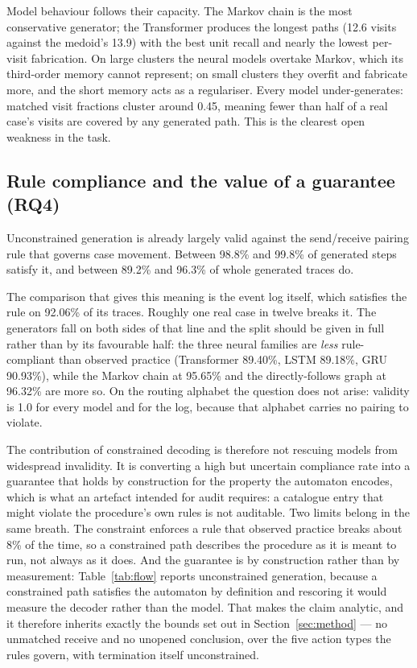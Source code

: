Model behaviour follows their capacity. The Markov chain is the most conservative generator; the
Transformer produces the longest paths (12.6 visits against the medoid's 13.9) with the best
unit recall and nearly the lowest per-visit fabrication. On large clusters the neural models
overtake Markov, which its third-order memory cannot represent; on small clusters they overfit
and fabricate more, and the short memory acts as a regulariser. Every model under-generates:
matched visit fractions cluster around 0.45, meaning fewer than half of a real case's visits are
covered by any generated path. This is the clearest open weakness in the task.



\subsection{Rule compliance and the value of a guarantee (RQ4)}\label{sec:res-rq4}

Unconstrained generation is already largely valid against the send/receive pairing rule that
governs case movement. Between 98.8\% and 99.8\% of generated steps satisfy it, and between
89.2\% and 96.3\% of whole generated traces do.

The comparison that gives this meaning is the event log itself, which satisfies the rule on
92.06\% of its traces. Roughly one real case in twelve breaks it. The generators fall on both
sides of that line and the split should be given in full rather than by its favourable half:
the three neural families are \emph{less} rule-compliant than observed practice (Transformer
89.40\%, LSTM 89.18\%, GRU 90.93\%), while the Markov chain at 95.65\% and the directly-follows
graph at 96.32\% are more so. On the routing alphabet the question does not arise: validity is
1.0 for every model and for the log, because that alphabet carries no pairing to violate.

The contribution of constrained decoding is therefore not rescuing models from widespread
invalidity. It is converting a high but uncertain compliance rate into a guarantee that holds by
construction for the property the automaton encodes, which is what an artefact intended for
audit requires: a catalogue entry that might violate the procedure's own rules is not auditable.
Two limits belong in the same breath. The constraint enforces a rule that observed practice
breaks about 8\% of the time, so a constrained path describes the procedure as it is meant to
run, not always as it does. And the guarantee is by construction rather than by measurement:
Table~\ref{tab:flow} reports unconstrained generation, because a constrained path satisfies the
automaton by definition and rescoring it would measure the decoder rather than the model. That
makes the claim analytic, and it therefore inherits exactly the bounds set out in
Section~\ref{sec:method} --- no unmatched receive and no unopened conclusion, over the five
action types the rules govern, with termination itself unconstrained.

